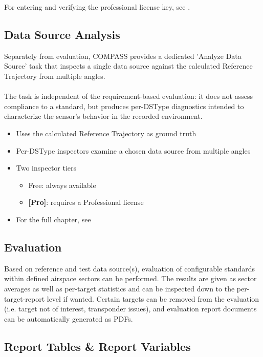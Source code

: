 For entering and verifying the professional license key, see . \\

\subsection*{Data Source Analysis}

Separately from evaluation, COMPASS provides a dedicated 'Analyze Data Source' task that inspects a single data source against the calculated Reference Trajectory from multiple angles. \\\\

The task is independent of the requirement-based evaluation: it does not assess compliance to a standard, but produces per-DSType diagnostics intended to characterize the sensor's behavior in the recorded environment. \\

\begin{itemize}
\item Uses the calculated Reference Trajectory as ground truth
\item Per-DSType inspectors examine a chosen data source from multiple angles
\item Two inspector tiers
\begin{itemize}
\item Free: always available
\item \textbf{[Pro]}: requires a Professional license
\end{itemize}
\item For the full chapter, see 
\end{itemize}

\subsection*{Evaluation}

Based on reference and test data source(s), evaluation of configurable standards within defined airspace sectors can be performed. The results are given as sector averages as well as per-target statistics and can be inspected down to the per-target-report level if wanted. Certain targets can be removed from the evaluation (i.e. target not of interest, transponder issues), and evaluation report documents can be automatically generated as PDFs.

\subsection*{Report Tables \& Report Variables}

